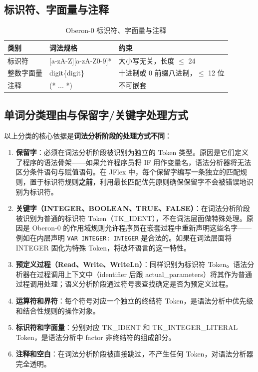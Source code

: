 \subsection{标识符、字面量与注释}

\begin{table}[htbp]
    \centering
    \begin{tabular}{|l|l|l|}
    \hline
    \textbf{类别} & \textbf{词法规格} & \textbf{约束} \\
    \hline
    标识符 & [a-zA-Z][a-zA-Z0-9]* & 大小写无关，长度 $\le$ 24 \\
    整数字面量 & digit\{digit\} & 十进制或 0 前缀八进制，$\le$ 12 位 \\
    注释 & (* ... *) & 不可嵌套 \\
    \hline
    \end{tabular}
    \caption{Oberon-0 标识符、字面量与注释}
    \label{tab:identifiers}
\end{table}

\subsection{单词分类理由与保留字/关键字处理方式}

以上分类的核心依据是\textbf{词法分析阶段的处理方式不同}：

\begin{enumerate}
    \item \textbf{保留字}：必须在词法分析阶段被识别为独立的 Token 类型。原因是它们定义了程序的语法骨架——如果允许程序员将 IF 用作变量名，语法分析器将无法区分条件语句与赋值语句。在 JFlex 中，每个保留字编写一条独立的匹配规则，置于标识符规则\textbf{之前}，利用最长匹配优先原则确保保留字不会被错误地识别为标识符。
    \item \textbf{关键字（INTEGER、BOOLEAN、TRUE、FALSE）}：在词法分析阶段被识别为普通的标识符 Token（TK\_IDENT），不在词法层面做特殊处理。原因是 Oberon-0 的作用域规则允许程序员在嵌套过程中重新声明这些名字——例如在内层声明 \texttt{VAR INTEGER: INTEGER} 是合法的。如果在词法层面将 INTEGER 固化为特殊 Token，将破坏语言的这一特性。
    \item \textbf{预定义过程（Read、Write、WriteLn）}：同样识别为标识符 Token。语法分析器在过程调用上下文中（identifier 后跟 actual\_parameters）将其作为普通过程调用处理；语义分析阶段通过符号表查找确定是否为预定义过程。
    \item \textbf{运算符和界符}：每个符号对应一个独立的终结符 Token，是语法分析中优先级和结合性规则的操作对象。
    \item \textbf{标识符和字面量}：分别对应 TK\_IDENT 和 TK\_INTEGER\_LITERAL Token，是语法分析中 factor 非终结符的组成部分。
    \item \textbf{注释和空白}：在词法分析阶段被直接跳过，不产生任何 Token，对语法分析器完全透明。
\end{enumerate}

